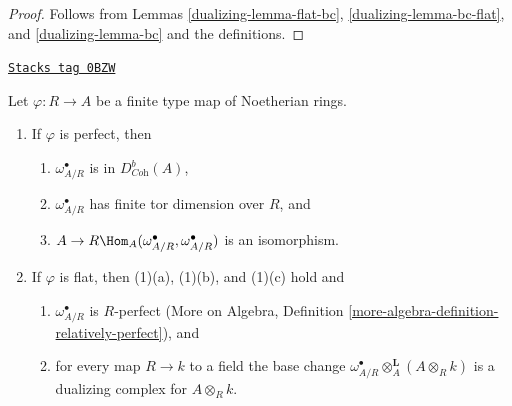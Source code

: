 \begin{proof}

Follows from Lemmas \ref{dualizing-lemma-flat-bc}, \ref{dualizing-lemma-bc-flat}, and
\ref{dualizing-lemma-bc} and the definitions.
\end{proof}

\begin{lemma}
\label{dualizing-lemma-relative-dualizing-algebraic}
\href{https://stacks.math.columbia.edu/tag/0BZW}{\texttt{Stacks tag 0BZW}}

Let $\varphi : R \to A$ be a finite type map of Noetherian rings.
\begin{enumerate}
\item If $\varphi$ is perfect, then
\begin{enumerate}
\item $\omega_{A/R}^\bullet$ is in $D^b_{\textit{Coh}}(A)$,
\item $\omega_{A/R}^\bullet$ has finite tor dimension over $R$, and
\item $A \to R\Hom_A(\omega_{A/R}^\bullet, \omega_{A/R}^\bullet)$
is an isomorphism.
\end{enumerate}
\item If $\varphi$ is flat, then (1)(a), (1)(b), and (1)(c) hold and
\begin{enumerate}
\item $\omega_{A/R}^\bullet$ is $R$-perfect
(More on Algebra,
Definition \ref{more-algebra-definition-relatively-perfect}), and
\item for every map $R \to k$ to a field the base change
$\omega_{A/R}^\bullet \otimes_A^\mathbf{L} (A \otimes_R k)$
is a dualizing complex for $A \otimes_R k$.
\end{enumerate}
\end{enumerate}
\end{lemma}


